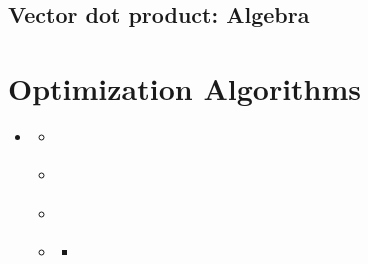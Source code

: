\documentclass[letterpaper,10pt,english]{sphinxmanual}
\begin{document}
\section{Vector dot product: Algebra}
\label{\detokenize{LinearAlgebra/VectorMultiplication:vector-dot-product-algebra}}

\chapter{Optimization Algorithms}
\label{\detokenize{OperationsResearch/OptimizationAlgorithms:optimization-algorithms}}\label{\detokenize{OperationsResearch/OptimizationAlgorithms::doc}}
\begin{sphinxShadowBox}
\begin{itemize}
\item {} 
\sphinxAtStartPar
{}\label{\detokenize{OperationsResearch/OptimizationAlgorithms:id4}}{\hyperref[\detokenize{OperationsResearch/OptimizationAlgorithms:optimization-algorithms}]{}}
\begin{itemize}
\item {} 
\sphinxAtStartPar
{}\label{\detokenize{OperationsResearch/OptimizationAlgorithms:id5}}{\hyperref[\detokenize{OperationsResearch/OptimizationAlgorithms:the-simplex-method}]{}}

\item {} 
\sphinxAtStartPar
{}\label{\detokenize{OperationsResearch/OptimizationAlgorithms:id6}}{\hyperref[\detokenize{OperationsResearch/OptimizationAlgorithms:the-branch-and-bound-algorithm}]{}}

\item {} 
\sphinxAtStartPar
{}\label{\detokenize{OperationsResearch/OptimizationAlgorithms:id7}}{\hyperref[\detokenize{OperationsResearch/OptimizationAlgorithms:gradient-descent-and-newton-s-method}]{}}

\item {} 
\sphinxAtStartPar
{}\label{\detokenize{OperationsResearch/OptimizationAlgorithms:id8}}{\hyperref[\detokenize{OperationsResearch/OptimizationAlgorithms:examples}]{}}
\begin{itemize}
\item {} 
\sphinxAtStartPar
{}\label{\detokenize{OperationsResearch/OptimizationAlgorithms:id9}}{\hyperref[\detokenize{OperationsResearch/OptimizationAlgorithms:machine-scheduling-problem}]{}}


\end{itemize}
\end{itemize}
\end{itemize}
\end{sphinxShadowBox}
\end{document}
